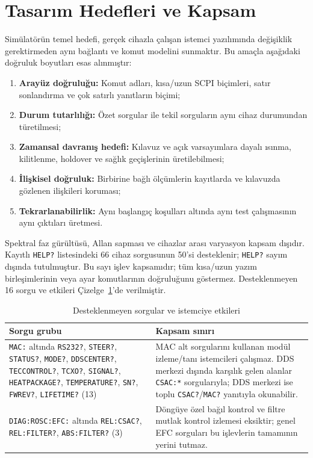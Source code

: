 \documentclass[9pt,twocolumn,a4paper]{extarticle}
\begin{document}
\section{Tasarım Hedefleri ve Kapsam}
Simülatörün temel hedefi, gerçek cihazla çalışan istemci yazılımında değişiklik gerektirmeden aynı bağlantı ve komut modelini sunmaktır. Bu amaçla aşağıdaki doğruluk boyutları esas alınmıştır:
\begin{enumerate}
    \item \textbf{Arayüz doğruluğu:} Komut adları, kısa/uzun SCPI biçimleri, satır sonlandırma ve çok satırlı yanıtların biçimi;
    \item \textbf{Durum tutarlılığı:} Özet sorgular ile tekil sorguların aynı cihaz durumundan türetilmesi;
    \item \textbf{Zamansal davranış hedefi:} Kılavuz ve açık varsayımlara dayalı ısınma, kilitlenme, holdover ve sağlık geçişlerinin üretilebilmesi;
    \item \textbf{İlişkisel doğruluk:} Birbirine bağlı ölçümlerin kayıtlarda ve kılavuzda gözlenen ilişkileri koruması;
    \item \textbf{Tekrarlanabilirlik:} Aynı başlangıç koşulları altında aynı test çalışmasının aynı çıktıları üretmesi.
\end{enumerate}

Spektral faz gürültüsü, Allan sapması ve cihazlar arası varyasyon kapsam dışıdır. Kayıtlı \texttt{HELP?} listesindeki 66 cihaz sorgusunun 50'si desteklenir; \texttt{HELP?} sayım dışında tutulmuştur. Bu sayı işlev kapsamıdır; tüm kısa/uzun yazım birleşimlerinin veya ayar komutlarının doğruluğunu göstermez. Desteklenmeyen 16 sorgu ve etkileri Çizelge~\ref{tab:unsupported}'de verilmiştir.

\begin{table}[t]
\caption{Desteklenmeyen sorgular ve istemciye etkileri}
\label{tab:unsupported}
\centering
\fontsize{9}{10.8}\selectfont
\setlength{\tabcolsep}{3pt}
\begin{tabular}{p{}p{}}
\toprule
\textbf{Sorgu grubu} & \textbf{Kapsam sınırı} \\
\midrule
\texttt{MAC:} altında \texttt{RS232?}, \texttt{STEER?}, \texttt{STATUS?}, \texttt{MODE?}, \texttt{DDSCENTER?}, \texttt{TECCONTROL?}, \texttt{TCXO?}, \texttt{SIGNAL?}, \texttt{HEATPACKAGE?}, \texttt{TEMPERATURE?}, \texttt{SN?}, \texttt{FWREV?}, \texttt{LIFETIME?} (13)
 & MAC alt sorgularını kullanan modül izleme/tanı istemcileri çalışmaz. DDS merkezi dışında karşılık gelen alanlar \texttt{CSAC:*} sorgularıyla; DDS merkezi ise toplu \texttt{CSAC?}/\texttt{MAC?} yanıtıyla okunabilir. \\
\texttt{DIAG:ROSC:EFC:} altında \texttt{REL:CSAC?}, \texttt{REL:FILTER?}, \texttt{ABS:FILTER?} (3)
 & Döngüye özel bağıl kontrol ve filtre mutlak kontrol izlemesi eksiktir; genel EFC sorguları bu işlevlerin tamamının yerini tutmaz. \\
\bottomrule
\end{tabular}
\end{table}
\end{document}
